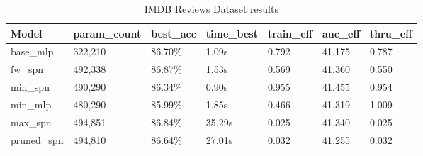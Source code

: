\begin{table}[h!]
    \centering
    \begin{tabular}{|l|l|l|l|l|l|l|}
    \hline
    \textbf{Model} & \textbf{param\_count} & \textbf{best\_acc} & \textbf{time\_best} & \textbf{train\_eff} & \textbf{auc\_eff} & \textbf{thru\_eff} \\
    \hline
    base\_mlp & 322,210 & 86.70\% & 1.09s & 0.792 & \cellcolor{red!25}41.175 & 0.787 \\
    fw\_spn & 492,338 & \cellcolor{green!25}86.87\% & 1.53s & 0.569 & 41.360 & 0.550 \\
    min\_spn & 490,290 & \cellcolor{red!25}86.34\% & \cellcolor{green!25}0.90s & \cellcolor{green!25}0.955 & \cellcolor{green!25}41.455 & 0.954 \\
    min\_mlp & 480,290 & 85.99\% & 1.85s & 0.466 & 41.319 & \cellcolor{green!25}1.009 \\
    max\_spn & 494,851 & 86.84\% & \cellcolor{red!25}35.29s & \cellcolor{red!25}0.025 & 41.340 & \cellcolor{red!25}0.025 \\
    pruned\_spn & 494,810 & 86.64\% & 27.01s & 0.032 & 41.255 & 0.032 \\
    \hline
    \end{tabular}
    \caption{IMDB Reviews Dataset results}
    \label{tab:imdbResults}
\end{table}

